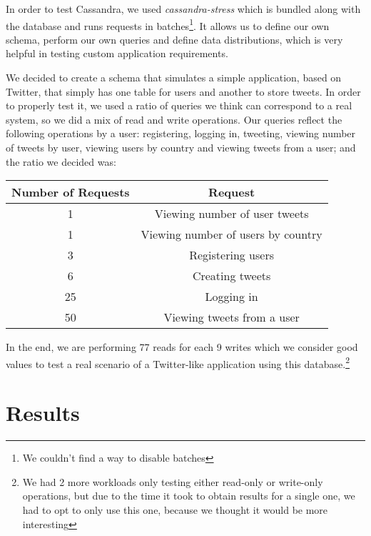 \documentclass[runningheads]{llncs}
\begin{document}
In order to test Cassandra, we used \emph{cassandra-stress} which is bundled along with the database and runs requests in batches\footnote{We couldn't find a way to disable batches}. It allows us to define our own schema, perform our own queries and define data distributions, which is very helpful in testing custom application requirements.\par
We decided to create a schema that simulates a simple application, based on Twitter, that simply has one table for users and another to store tweets. In order to properly test it, we used a ratio of queries we think can correspond to a real system, so we did a mix of read and write operations. Our queries reflect the following operations by a user: registering, logging in, tweeting, viewing number of tweets by user, viewing users by country and viewing tweets from a user; and the ratio we decided was:
\begin{center}
    \begin{tabular}{|c|c|}
       \hline
            Number of Requests & Request \\
       \hline
        1 & Viewing number of user tweets \\
        1 & Viewing number of users by country \\
        3 & Registering users \\
        6 & Creating tweets \\
       25 & Logging in \\
       50 & Viewing tweets from a user \\
       \hline
    \end{tabular}
\end{center}

In the end, we are performing 77 reads for each 9 writes which we consider good values to test a real scenario of a Twitter-like application using this database.\footnote{We had 2 more workloads only testing either read-only or write-only operations, but due to the time it took to obtain results for a single one, we had to opt to only use this one, because we thought it would be more interesting}


\section{Results}
\end{document}
